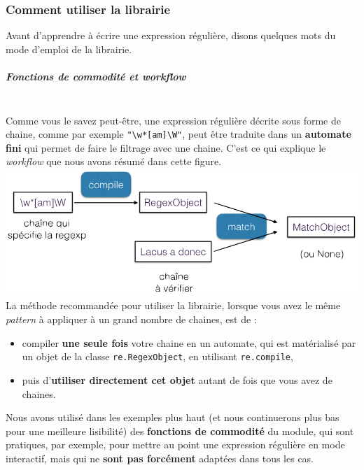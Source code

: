     \hypertarget{comment-utiliser-la-librairie}{%
\subsubsection{Comment utiliser la
librairie}\label{comment-utiliser-la-librairie}}

    Avant d'apprendre à écrire une expression régulière, disons quelques
mots du mode d'emploi de la librairie.

    \hypertarget{fonctions-de-commodituxe9-et-workflow}{%
\subparagraph{\texorpdfstring{Fonctions de commodité et
\emph{workflow}}{Fonctions de commodité et workflow}\\\\}\label{fonctions-de-commodituxe9-et-workflow}}

    Comme vous le savez peut-être, une expression régulière décrite sous
forme de chaine, comme par exemple
\texttt{"\textbackslash{}w*{[}am{]}\textbackslash{}W"}, peut être
traduite dans un \textbf{automate fini} qui permet de faire le filtrage
avec une chaine. C'est ce qui explique le \emph{workflow} que nous avons
résumé dans cette figure.\\

\includegraphics{medias/re-workflow.png}\\

    La méthode recommandée pour utiliser la librairie, lorsque vous avez le
même \emph{pattern} à appliquer à un grand nombre de chaines, est de :

\begin{itemize}
	\item 
	compiler \textbf{une seule fois} votre chaine en un automate, qui est
	matérialisé par un objet de la classe \texttt{re.RegexObject}, en
	utilisant \texttt{re.compile},
	\item
	puis d'\textbf{utiliser directement cet
	objet} autant de fois que vous avez de chaines.
\end{itemize}

    Nous avons utilisé dans les exemples plus haut (et nous continuerons
plus bas pour une meilleure lisibilité) des \textbf{fonctions de
commodité} du module, qui sont pratiques, par exemple, pour mettre au
point une expression régulière en mode interactif, mais qui ne
\textbf{sont pas forcément} adaptées dans tous les cas.

